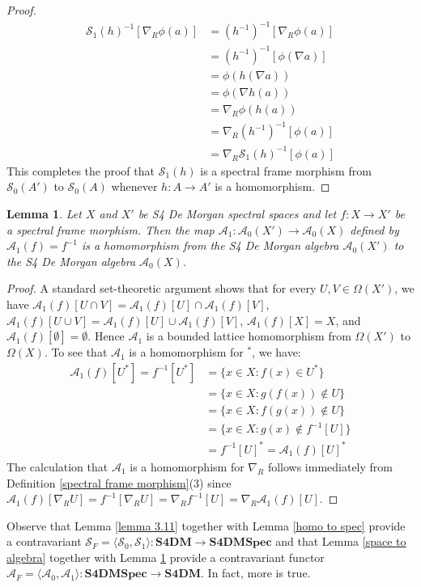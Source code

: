 \documentclass{amsart}
\theoremstyle{plain}
\newtheorem{lemma}[theorem]{Lemma}
\theoremstyle{definition}
\begin{document}
\begin{proof}
\begin{align*}
    \mathcal{S}_1(h)^{-1}[\nabla_R\phi(a)]&=(h^{-1})^{-1}[\nabla_R\phi(a)]
    \\&=(h^{-1})^{-1}[\phi(\nabla a)]
    \\&=\phi(h(\nabla a))
    \\&=\phi(\nabla h(a))
    \\&=\nabla_R\phi(h(a))
    \\&=\nabla_R(h^{-1})^{-1}[\phi(a)]
    \\&=\nabla_R\mathcal{S}_1(h)^{-1}[\phi(a)]
\end{align*}
This completes the proof that $\mathcal{S}_1(h)$ is a spectral frame morphism from $\mathcal{S}_0(A')$ to $\mathcal{S}_0(A)$ whenever $h\colon A\to A'$ is a homomorphism.  
\end{proof}
  

\begin{lemma}\label{spec to homo}
    Let $X$ and $X'$ be S4 De Morgan spectral spaces and let $f\colon X\to X'$ be a spectral frame morphism. Then the map $\mathcal{A}_1\colon\mathcal{A}_0(X')\to\mathcal{A}_0(X)$ defined by $\mathcal{A}_1(f)=f^{-1}$ is a homomorphism from the S4 De Morgan algebra $\mathcal{A}_0(X')$ to the S4 De Morgan algebra $\mathcal{A}_0(X)$.  
\end{lemma}
\begin{proof}
    A standard set-theoretic argument shows that for every $U,V\in\Omega(X')$, we have $\mathcal{A}_1(f)[U\cap V]=\mathcal{A}_1(f)[U]\cap\mathcal{A}_1(f)[V]$, $\mathcal{A}_1(f)[U\cup V]=\mathcal{A}_1(f)[U]\cup\mathcal{A}_1(f)[V]$, $\mathcal{A}_1(f)[X]=X$, and $\mathcal{A}_1(f)[\emptyset]=\emptyset$. Hence $\mathcal{A}_1$ is a bounded lattice homomorphism from $\Omega(X')$ to $\Omega(X)$. To see that $\mathcal{A}_1$ is a homomorphism for $^*$, we have: 
    \begin{align*}
        \mathcal{A}_1(f)[U^*]=f^{-1}[U^*]&=\{x\in X:f(x)\in U^*\}
        \\&=\{x\in X:g(f(x))\not\in U\}
        \\&=\{x\in X:f(g(x))\not\in U\}
        \\&=\{x\in X:g(x)\not\in f^{-1}[U]\}
        \\&=f^{-1}[U]^*=\mathcal{A}_1(f)[U]^*
    \end{align*}
    The calculation that $\mathcal{A}_1$ is a homomorphism for $\nabla_R$ follows immediately from Definition \ref{spectral frame morphism}(3) since $\mathcal{A}_1(f)[\nabla_RU]=f^{-1}[\nabla_RU]=\nabla_Rf^{-1}[U]=\nabla_R\mathcal{A}_1(f)[U]$.                 
\end{proof}
Observe that Lemma \ref{lemma 3.11} together with Lemma \ref{homo to spec} provide a contravariant $\mathcal{S}_F=\langle\mathcal{S}_0,\mathcal{S}_1\rangle\colon\mathbf{S4DM}\to\mathbf{S4DMSpec}$ and that Lemma \ref{space to algebra} together with Lemma \ref{spec to homo} provide a contravariant functor $\mathcal{A}_F=\langle\mathcal{A}_0,\mathcal{A}_1\rangle\colon\mathbf{S4DMSpec}\to\mathbf{S4DM}$. In fact, more is true. 
\end{document}
